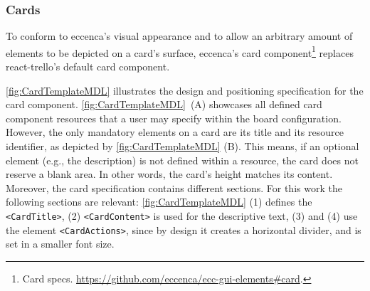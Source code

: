 \subsubsection{Cards}

To conform to eccenca’s visual appearance and to allow an arbitrary amount of elements to be depicted on a card’s surface, eccenca’s card component\footnote{Card specs. \url{https://github.com/eccenca/ecc-gui-elements\#card}.} replaces react-trello’s default card component.

\autoref{fig:CardTemplateMDL} illustrates the design and positioning specification for the card component. \autoref{fig:CardTemplateMDL}~(A) showcases all defined card component resources that a user may specify within the board configuration. However, the only mandatory elements on a card are its title and its resource identifier, as depicted by \autoref{fig:CardTemplateMDL} (B). This means, if an optional element (e.g., the description) is not defined within a resource, the card does not reserve a blank area. In other words, the card’s height matches its content. Moreover, the card specification contains different sections. For this work the following sections are relevant: \autoref{fig:CardTemplateMDL} (1) defines the \texttt{<CardTitle>}, (2) \texttt{<CardContent>} is used for the descriptive text, (3) and (4) use the element \texttt{<CardActions>}, since by design it creates a horizontal divider, and is set in a smaller font size.



